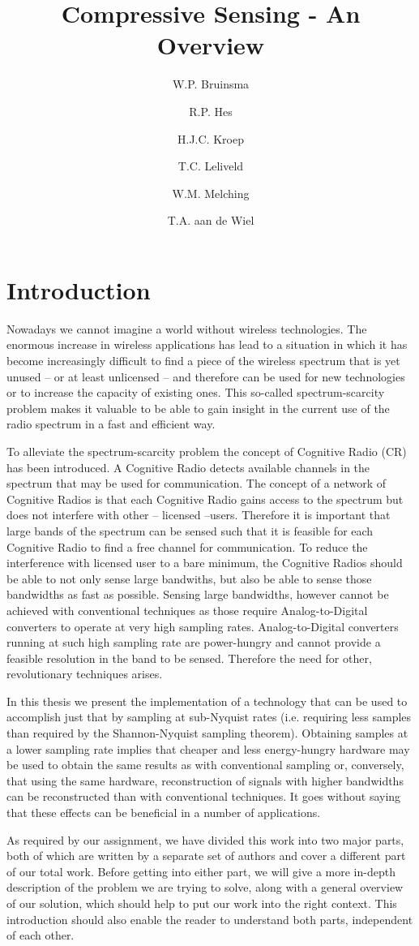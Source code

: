 \documentclass[a4paper, openany, oneside]{memoir}
\title{Compressive Sensing - An Overview}
\author{W.P. Bruinsma \and R.P. Hes \and H.J.C. Kroep \and T.C. Leliveld \and W.M. Melching \and T.A. aan de Wiel}
\begin{document}
\chapter{Introduction}
Nowadays we cannot imagine a world without wireless technologies. The enormous increase in wireless applications has lead to a situation in which it has become increasingly difficult to find a piece of the wireless spectrum that is yet unused -- or at least unlicensed -- and therefore can be used for new technologies or to increase the capacity of existing ones. This so-called spectrum-scarcity problem makes it valuable to be able to gain insight in the current use of the radio spectrum in a fast and efficient way.

To alleviate the spectrum-scarcity problem the concept of Cognitive Radio (CR) has been introduced. A Cognitive Radio detects available channels in the spectrum that may be used for communication. The concept of a network of Cognitive Radios is that each Cognitive Radio gains access to the spectrum but does not interfere with other -- licensed --users. Therefore it is important that large bands of the spectrum can be sensed such that it is feasible for each Cognitive Radio to find a free channel for communication. To reduce the interference with licensed user to a bare minimum, the Cognitive Radios should be able to not only sense large bandwiths, but also be able to sense those bandwidths as fast as possible. Sensing large bandwidths, however cannot be achieved with conventional techniques as those require Analog-to-Digital converters to operate at very high sampling rates. Analog-to-Digital converters running at such high sampling rate are power-hungry and cannot provide a feasible resolution in the band to be sensed. Therefore the need for other, revolutionary techniques arises.

In this thesis we present the implementation of a technology that can be used to accomplish just that by sampling at sub-Nyquist rates (i.e. requiring less samples than required by the Shannon-Nyquist sampling theorem).  Obtaining samples at a lower sampling rate implies that cheaper and less energy-hungry hardware may be used to obtain the same results as with conventional sampling or, conversely, that using the same hardware, reconstruction of signals with higher bandwidths can be reconstructed than with conventional techniques. It goes without saying that these effects can be beneficial in a number of applications.

As required by our assignment, we have divided this work into two major parts, both of which are written by a separate set of authors and cover a different part of our total work. Before getting into either part, we will give a more in-depth description of the problem we are trying to solve, along with a general overview of our solution, which should help to put our work into the right context. This introduction should also enable the reader to understand both parts, independent of each other.
\end{document}
